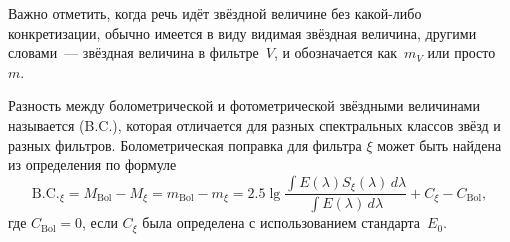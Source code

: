 Важно отметить, когда речь идёт звёздной величине без какой-либо кон\-кретизации, обычно имеется в виду видимая звёздная величина, другими словами~--- звёздная величина в фильтре~$V$, и обозначается как~$m_V$ или просто~$m$.

Разность между болометрической и фотометрической звёздными величинами называется  (B.C.), которая отличается для разных спектральных классов звёзд и разных фильтров. Болометрическая поправка для фильтра $\xi$ может быть найдена из определения по формуле
\begin{equation}
    \text{B.C.}_\xi = M_\text{Bol} - M_\xi = m_\text{Bol} - m_\xi = 2.5\lg \frac{\int E(\lambda) S_\xi(\lambda) \, d \lambda}{\int E(\lambda)\, d \lambda} + C_\xi - C_\text{Bol},
\end{equation}
где $C_\text{Bol}=0$, если $C_\xi$ была определена с использованием стандарта~$E_0$.

